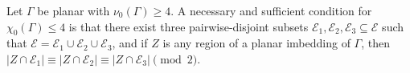 Let $\Gamma$ be planar with $\nu_0(\Gamma) \geq 4$. A necessary and sufficient condition for $\chi_0(\Gamma) \leq 4$ is that there exist three pairwise-disjoint subsets $\mathcal{E}_1, \mathcal{E}_2, \mathcal{E}_3 \subseteq \mathcal{E}$ such that $\mathcal{E} = \mathcal{E}_1 \cup \mathcal{E}_2 \cup \mathcal{E}_3$, and if $Z$ is any region of a planar imbedding of $\Gamma$, then $|Z \cap \mathcal{E}_1| \equiv |Z \cap \mathcal{E}_2| \equiv |Z \cap \mathcal{E}_3| \pmod{2}$.
